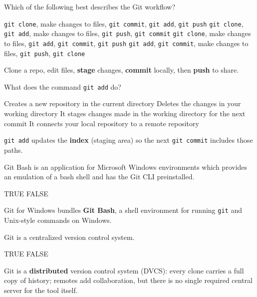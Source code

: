 \question[4]
Which of the following best describes the Git workflow?
\begin{choices}
  \choice \texttt{git clone}, make changes to files, \texttt{git commit}, \texttt{git add}, \texttt{git push}
  \choice \texttt{git clone}, \texttt{git add}, make changes to files, \texttt{git push}, \texttt{git commit}
  \CorrectChoice \texttt{git clone}, make changes to files, \texttt{git add}, \texttt{git commit}, \texttt{git push}
  \choice \texttt{git add}, \texttt{git commit}, make changes to files, \texttt{git push}, \texttt{git clone}
\end{choices}
\begin{solution}
  Clone a repo, edit files, \textbf{stage} changes, \textbf{commit} locally, then \textbf{push} to share.
\end{solution}

\question[4]
What does the command \texttt{git add} do?
\begin{choices}
  \choice Creates a new repository in the current directory
  \choice Deletes the changes in your working directory
  \CorrectChoice It stages changes made in the working directory for the next commit
  \choice It connects your local repository to a remote repository
\end{choices}
\begin{solution}
  \texttt{git add} updates the \textbf{index} (staging area) so the next \texttt{git commit} includes those paths.
\end{solution}

\newpage


\question[4]
Git Bash is an application for Microsoft Windows environments which provides an emulation of a bash shell and has the Git CLI preinstalled.
\begin{choices}
  \CorrectChoice TRUE
  \choice FALSE
\end{choices}
\begin{solution}
  Git for Windows bundles \textbf{Git Bash}, a shell environment for running \texttt{git} and Unix-style commands on Windows.
\end{solution}

\question[4]
Git is a centralized version control system.
\begin{choices}
  \choice TRUE
  \CorrectChoice FALSE
\end{choices}
\begin{solution}
  Git is a \textbf{distributed} version control system (DVCS): every clone carries a full copy of history; remotes add collaboration, but there is no single required central server for the tool itself.
\end{solution}

